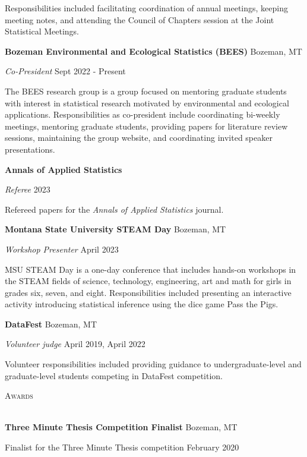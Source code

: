 \documentclass[a4paper]{article}
\newcommand{\lineunder} {
	\vspace*{-8pt} \\
	\hspace*{-18pt} \hrulefill \\
}
\newcommand{\header} [1] {
	{\hspace*{-18pt}\vspace*{6pt} \textsc{#1}}
	\vspace*{-6pt} \lineunder
}
\begin{document}
Responsibilities included facilitating coordination of annual meetings,
keeping meeting notes, and attending the Council of Chapters session at
the Joint Statistical Meetings. \vspace*{2mm}

\textbf{Bozeman Environmental and Ecological Statistics (BEES)}
\hfill Bozeman, MT

\emph{Co-President} \hfill Sept 2022 - Present

The BEES research group is a group focused on mentoring graduate
students with interest in statistical research motivated by
environmental and ecological applications. Responsibilities as
co-president include coordinating bi-weekly meetings, mentoring graduate
students, providing papers for literature review sessions, maintaining
the group website, and coordinating invited speaker presentations.
\vspace*{2mm}

\textbf{Annals of Applied Statistics}

\emph{Referee} \hfill 2023

Refereed papers for the \emph{Annals of Applied Statistics} journal.
\vspace*{2mm}

\textbf{Montana State University STEAM Day} \hfill Bozeman, MT

\emph{Workshop Presenter} \hfill April 2023

MSU STEAM Day is a one-day conference that includes hands-on workshops
in the STEAM fields of science, technology, engineering, art and math
for girls in grades six, seven, and eight. Responsibilities included
presenting an interactive activity introducing statistical inference
using the dice game Pass the Pigs. \vspace*{2mm}

\textbf{DataFest} \hfill Bozeman, MT

\emph{Volunteer judge} \hfill April 2019, April 2022

Volunteer responsibilities included providing guidance to
undergraduate-level and graduate-level students competing in DataFest
competition. \vspace*{2mm}

\header{Awards}
\vspace*{2mm}

\textbf{Three Minute Thesis Competition Finalist} \hfill Bozeman, MT

Finalist for the Three Minute Thesis competition \hfill February 2020
\end{document}
